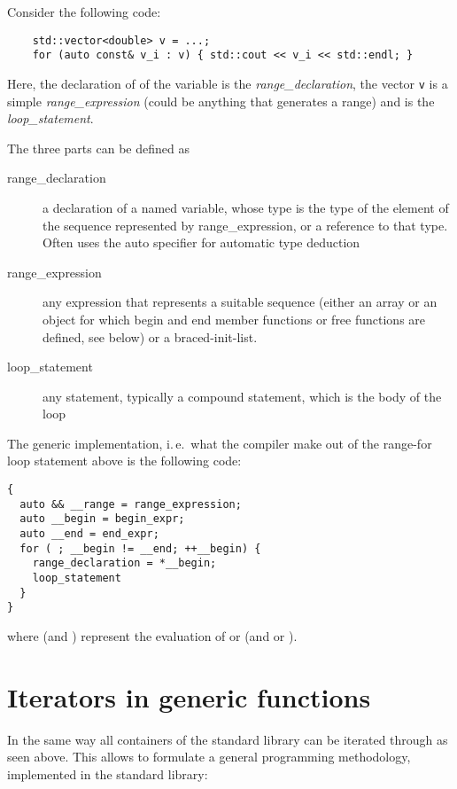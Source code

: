 \begin{example}
  Consider the following code:
  \begin{verbatim}
    std::vector<double> v = ...;
    for (auto const& v_i : v) { std::cout << v_i << std::endl; }
  \end{verbatim}

  Here, the declaration of of the variable  is the \emph{range\_declaration}, the vector \texttt{v} is a simple
  \emph{range\_expression} (could be anything that generates a range) and  is the \emph{loop\_statement}.
\end{example}

The three parts can be defined as
\begin{description}
  \item[range\_declaration]
    a declaration of a named variable, whose type is the type of the element of the sequence represented by range\_expression, or a reference
    to that type. Often uses the auto specifier for automatic type deduction
  \item[range\_expression]
    any expression that represents a suitable sequence (either an array or an object for which begin and end member functions or free functions
    are defined, see below) or a braced-init-list.
  \item[loop\_statement]
    any statement, typically a compound statement, which is the body of the loop
\end{description}

The generic implementation, i.\,e.\ what the compiler make out of the range-for loop statement above is the following code:
%
\begin{verbatim}
{
  auto && __range = range_expression;
  auto __begin = begin_expr;
  auto __end = end_expr;
  for ( ; __begin != __end; ++__begin) {
    range_declaration = *__begin;
    loop_statement
  }
}
\end{verbatim}
where  (and ) represent the evaluation of  or  (and  or ).


\section{Iterators in generic functions}
In the same way all containers of the standard library can be iterated through as seen above.
This allows to formulate a general programming methodology, implemented in the standard library:

